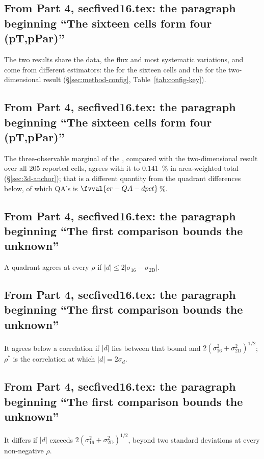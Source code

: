\subsection{From Part 4, secfived16.tex: the paragraph beginning ``The sixteen cells form four (pT,pPar)''}
The two results share the data, the flux and most systematic variations, and come from different estimators: the \estMultiD{} for the sixteen cells and the \estTwoD{} for the two-dimensional result (\S\ref{sec:method-config}, Table~\ref{tab:config-key}).

\subsection{From Part 4, secfived16.tex: the paragraph beginning ``The sixteen cells form four (pT,pPar)''}
The three-observable marginal of the \estMultiD{}, compared with the two-dimensional result over all 205 reported cells, agrees with it to \SI{0.141}{\percent} in area-weighted total (\S\ref{sec:3d-anchor}); that is a different quantity from the quadrant differences below, of which QA's is $\fvval{cr-QA-dpct}$\,\%.

\subsection{From Part 4, secfived16.tex: the paragraph beginning ``The first comparison bounds the unknown''}
A quadrant agrees at every $\rho$ if $|d|\leq2|\sigma_{16}-\sigma_{\mathrm{2D}}|$.

\subsection{From Part 4, secfived16.tex: the paragraph beginning ``The first comparison bounds the unknown''}
It agrees below a correlation if $|d|$ lies between that bound and $2(\sigma_{16}^2+\sigma_{\mathrm{2D}}^2)^{1/2}$; $\rho^{*}$ is the correlation at which $|d|=2\sigma_d$.

\subsection{From Part 4, secfived16.tex: the paragraph beginning ``The first comparison bounds the unknown''}
It differs if $|d|$ exceeds $2(\sigma_{16}^2+\sigma_{\mathrm{2D}}^2)^{1/2}$, beyond two standard deviations at every non-negative $\rho$.

